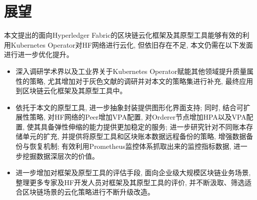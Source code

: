 \section{展望}

本文提出的面向Hyperledger Fabric的区块链云化框架及其原型工具能够有效的利用Kubernetes Operator对HF网络进行云化, 但依旧存在不足, 本文仍需在以下发面进行进一步优化提升。

\begin{itemize}[itemindent=2em]
    \item 深入调研学术界以及工业界关于Kubernetes Operator赋能其他领域提升质量属性的策略, 尤其增加对于灰色文献的调研并对本文的策略集进行补充, 最终应用到区块链云化框架及其原型工具中。

    \item 依托于本文的原型工具, 进一步抽象封装提供图形化界面支持; 同时, 结合可扩展性策略, 对HF网络的Peer增加VPA配置, 对Orderer节点增加HPA以及VPA配置, 使其具备弹性伸缩的能力提供更加稳定的服务; 进一步研究针对不同账本存储单元的扩充, 并提供将原型工具和区块账本数据远程备份的策略, 增强数据备份与恢复机制; 有效利用Prometheus监控体系抓取出来的监控指标数据, 进一步挖掘数据深层次的价值。 

    \item 进一步增加对框架及原型工具的评估手段, 面向企业级大规模区块链业务场景, 整理更多专家及HF开发人员对框架及其原型工具的评价, 并不断汲取、筛选适合区块链场景的云化策略进行不断升级改造。 

\end{itemize}
